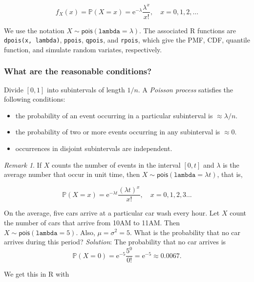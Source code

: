 \documentclass[]{book}
\providecommand{\tightlist}{%
  \setlength{\itemsep}{0pt}\setlength{\parskip}{0pt}}
\numberwithin{equation}{chapter}
\numberwithin{figure}{chapter}
\theoremstyle{plain}
\theoremstyle{definition}
\theoremstyle{remark}
\theoremstyle{definition}
\theoremstyle{definition}
\theoremstyle{remark}
\newtheorem*{remark}{Remark}
\let\BeginKnitrBlock\begin \let\EndKnitrBlock\end
\begin{document}
\begin{equation}
f_{X}(x)=\mathbb{P}(X=x)=\mathrm{e}^{-\lambda}\frac{\lambda^{x}}{x!},\quad x=0,1,2,\ldots
\end{equation}

We use the notation \(X\sim\mathsf{pois}(\mathtt{lambda}=\lambda)\). The
associated R functions are \texttt{dpois(x,\ lambda)}, \texttt{ppois},
\texttt{qpois}, and \texttt{rpois}, which give the PMF, CDF, quantile
function, and simulate random variates, respectively.

\subsubsection{What are the reasonable
conditions?}\label{what-are-the-reasonable-conditions}

Divide \([0,1]\) into subintervals of length \(1/n\). A \emph{Poisson
process}  satisfies the following conditions:

\begin{itemize}
\tightlist
\item
  the probability of an event occurring in a particular subinterval is
  \(\approx\lambda/n\).
\item
  the probability of two or more events occurring in any subinterval is
  \(\approx 0\).
\item
  occurrences in disjoint subintervals are independent.
\end{itemize}

\bigskip

\begin{remark}
If \(X\) counts the number of events in the interval \([0,t]\) and
\(\lambda\) is the average number that occur in unit time, then
\(X\sim\mathsf{pois}(\mathtt{lambda}=\lambda t)\), that is,

\begin{equation}
\mathbb{P}(X=x)=\mathrm{e}^{-\lambda t}\frac{(\lambda t)^{x}}{x!},\quad x=0,1,2,3\ldots
\end{equation}
\end{remark}

\bigskip

\BeginKnitrBlock{example}
\protect\hypertarget{ex:unnamed-chunk-242}{}{\label{ex:unnamed-chunk-242}}On
the average, five cars arrive at a particular car wash every hour. Let
\(X\) count the number of cars that arrive from 10AM to 11AM. Then
\(X\sim\mathsf{pois}(\mathtt{lambda}=5)\). Also, \(\mu=\sigma^{2}=5\).
What is the probability that no car arrives during this period?
\emph{Solution}: The probability that no car arrives is \[
\mathbb{P}(X=0)=\mathrm{e}^{-5}\frac{5^{0}}{0!}=\mathrm{e}^{-5}\approx0.0067.
\]
\EndKnitrBlock{example} We get this in R with
\end{document}
